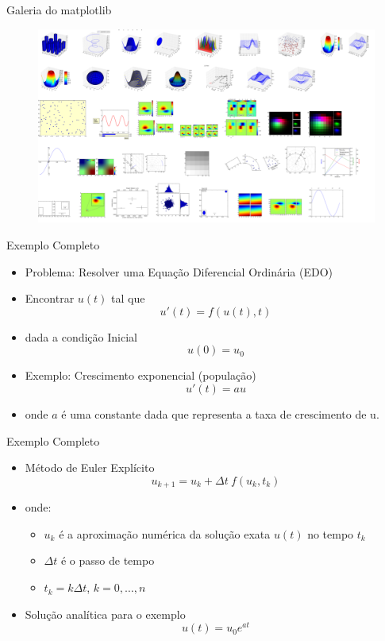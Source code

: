 \documentclass[12pt,t,graphics]{beamer}
\begin{document}
\begin{frame}[t,fragile]{Galeria do matplotlib}
	\begin{figure}
		\centering
		\includegraphics[scale=0.3]{img/matplot3.png}
	\end{figure}
\end{frame}

\begin{frame}[t,fragile]{Exemplo Completo}
	\begin{itemize}
		\item Problema: Resolver uma Equação Diferencial Ordinária (EDO)
		\item Encontrar $u(t)$ tal que
		$$u'(t) = f( u(t), t)$$
		\item dada a condição Inicial $$u(0) = u_0$$
		\item Exemplo: Crescimento exponencial (população) $$u'(t) = a u$$
		\item onde $a$ é uma constante dada que representa a taxa de crescimento de u.
	\end{itemize}
\end{frame}

\begin{frame}[t,fragile]{Exemplo Completo}
	\begin{itemize}
		\item Método de Euler Explícito
		$$u_{k+1} = u_k + \Delta t \ f(u_k, t_k)$$
		\item onde:
		\begin{itemize}
			\item $u_k$ é a aproximação numérica da solução exata $u(t)$ no tempo $t_k$
			\item $\Delta t$ é o passo de tempo
			\item $t_k = k \Delta t$, $k=0, \ldots, n$
		\end{itemize}
		\item Solução analítica para o exemplo $$u(t) = u_0 e^{a t}$$
	\end{itemize}
\end{frame}
\end{document}
